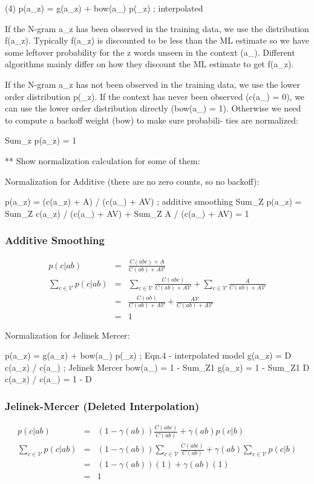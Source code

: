 \documentclass[ignorenonframetext]{beamer}
\newcommand{\vocab}{\mathcal{V}}
\begin{document}
       (4)  p(a_z) = g(a_z) + bow(a_) p(_z)   ; interpolated

       If the N-gram a_z has been observed in the training data, we use the distribution f(a_z).   Typically
       f(a_z)  is  discounted to be less than the ML estimate so we have some leftover probability for the z
       words unseen in the context (a_).  Different algorithms mainly differ on how  they  discount  the  ML
       estimate to get f(a_z).

       If  the  N-gram  a_z  has not been observed in the training data, we use the lower order distribution
       p(_z).  If the context has never been observed (c(a_) = 0), we can use the lower  order  distribution
       directly  (bow(a_) = 1).  Otherwise we need to compute a backoff weight (bow) to make sure probabili-
       ties are normalized:

            Sum_z p(a_z) = 1


** Show normalization calculation for some of them:

Normalization for Additive (there are no zero counts, so no backoff):
    
   p(a_z)  = (c(a_z) + A) / (c(a_) + AV)  ; additive smoothing
   Sum_Z p(a_z) = Sum_Z c(a_z) / (c(a_) + AV) + Sum_Z A / (c(a_) + AV)
                = 1

\begin{frame}\frametitle{Additive Smoothing}
\begin{eqnarray*}
p(c|ab) &=& \frac{C(abc) + A}{C(ab) + A\vocab} \\
\sum_{c\in\vocab} p(c|ab) &=& \sum_{c\in\vocab} \frac{C(abc)}{C(ab) +
  A\vocab} + \sum_{c\in\vocab} \frac{A}{C(ab) + A\vocab} \\
  &=& \frac{C(ab)}{C(ab) + A\vocab} + \frac{A\vocab}{C(ab) + A\vocab}\\
  &=& 1
\end{eqnarray*}
\end{frame}


Normalization for Jelinek Mercer:

   p(a_z)  = g(a_z) + bow(a_) p(_z)   ; Eqn.4 - interpolated model
   g(a_z)  = D c(a_z) / c(a_)         ; Jelinek Mercer
   bow(a_) = 1 - Sum_Z1 g(a_z)
           = 1 - Sum_Z1 D c(a_z) / c(a_)
           = 1 - D

\begin{frame}\frametitle{Jelinek-Mercer (Deleted Interpolation)}
\begin{eqnarray*}
p(c|ab) &=& (1-\gamma(ab)) \frac{C(abc)}{C(ab)} + \gamma(ab) p(c|b) \\
\sum_{c\in\vocab} p(c|ab) &=& (1-\gamma(ab)) \sum_{c\in\vocab}
\frac{C(abc)}{C(ab)} + \gamma(ab) \sum_{c\in\vocab} p(c|b) \\
&=& (1-\gamma(ab)) (1) + \gamma(ab) (1) \\
&=& 1
\end{eqnarray*}
\end{frame}
\end{document}
